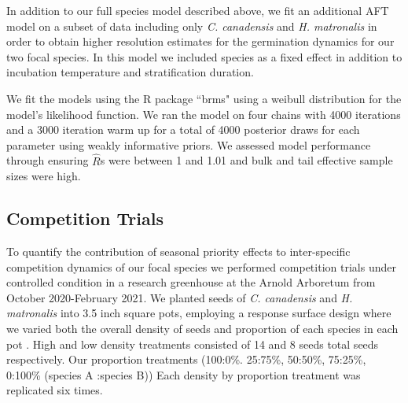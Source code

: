 \documentclass{article}\usepackage[]{graphicx}\usepackage[]{color}
\begin{document}
In addition to our full species model described above, we fit an additional AFT model on a subset of data including only \textit{C. canadensis} and \textit{H. matronalis} in order to obtain higher resolution estimates for the germination dynamics for our two focal species. In this model we included species as a fixed effect in addition to incubation temperature and stratification duration. 

\noindent We fit the models using the R package ``brms" \citep{Burkner2018} using a weibull distribution for the model's likelihood function. We ran the model on four chains with 4000 iterations and a 3000 iteration warm up for a total of 4000 posterior draws for each parameter using weakly informative priors. We assessed  model performance through ensuring $\hat{R}$s were between 1 and 1.01 and bulk and tail effective sample sizes were high.

\subsection*{Competition Trials}
\noindent To quantify the contribution of seasonal priority effects to inter-specific competition dynamics of our focal species we performed competition trials under controlled condition in a research greenhouse at the Arnold Arboretum from October 2020-February 2021. We planted seeds of \textit{C. canadensis} and \textit{H. matronalis} into 3.5 inch square pots, employing a response surface design where we varied both the overall density of seeds and proportion of each species in each pot \citep{Inouye2001}. High and low density treatments consisted of 14 and 8 seeds total seeds respectively. Our proportion treatments (100:0\%. 25:75\%, 50:50\%, 75:25\%, 0:100\% (species A :species B)) Each density by proportion treatment was replicated six times. %
\end{document}

